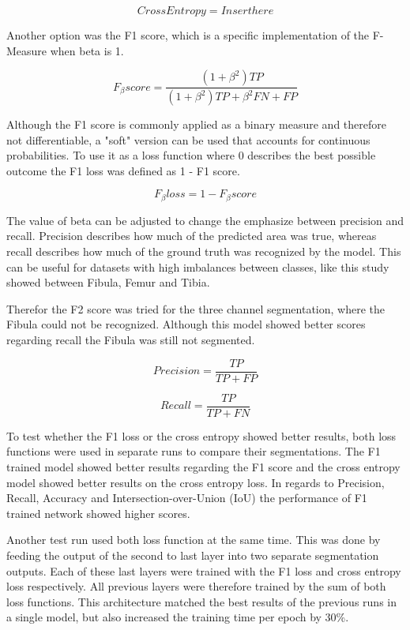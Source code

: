 \begin{equation}
Cross Entropy = Insert here
\end{equation}

Another option was the F1 score, which is a specific implementation of the F-Measure when beta is 1. 

\begin{equation}
F_\beta score= \frac{(1 + \beta^2) TP}{(1+\beta^2)TP+\beta^2FN+FP}
\end{equation}

Although the F1 score is commonly applied as a binary measure and therefore not differentiable, a "soft" version can be used that accounts for continuous probabilities. To use it as a loss function where 0 describes the best possible outcome the F1 loss was defined as 1 - F1 score.

\begin{equation}
F_\beta loss = 1 - F_\beta score
\end{equation}

The value of beta can be adjusted to change the emphasize between precision and recall. Precision describes how much of the predicted area was true, whereas recall describes how much of the ground truth was recognized by the model. This can be useful for datasets with high imbalances between classes, like this study showed between Fibula, Femur and Tibia. 

Therefor the F2 score was tried for the three channel segmentation, where the Fibula could not be recognized. Although this model showed better scores regarding recall the Fibula was still not segmented.

\begin{equation}
Precision = \frac{TP}{TP+FP}
\end{equation}

\begin{equation}
Recall = \frac{TP}{TP+FN}
\end{equation}

To test whether the F1 loss or the cross entropy showed better results, both loss functions were used in separate runs to compare their segmentations. The F1 trained model showed better results regarding the F1 score and the cross entropy model showed better results on the cross entropy loss. In regards to Precision, Recall, Accuracy and Intersection-over-Union (IoU) the performance of F1 trained network showed higher scores.

Another test run used both loss function at the same time. This was done by feeding the output of the second to last layer into two separate segmentation outputs. Each of these last layers were trained with the F1 loss and cross entropy loss respectively. All previous layers were therefore trained by the sum of both loss functions. This architecture matched the best results of the previous runs in a single model, but also increased the training time per epoch by 30\%.

